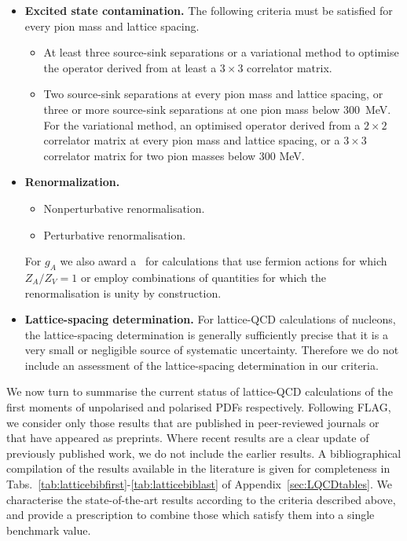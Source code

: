 \begin{itemize}
\item {\bfseries Excited state contamination.} 
The following criteria must be satisfied for every pion mass and lattice 
spacing.
%
\begin{itemize}
%
\item[\bstar] At least three source-sink separations or a variational method 
to optimise the operator derived from at least a $3\times 3$ correlator matrix.
% 
\item[\bcirc] Two source-sink separations at every pion mass and lattice 
spacing, or three or more source-sink separations at one pion mass below 
300~MeV. 
%
For the variational method, an optimised operator derived from a $2\times 2$ 
correlator matrix at every pion mass and lattice spacing, or a $3\times 3$ 
correlator matrix for two pion masses below 300 MeV.
%
\end{itemize}

\item {\bfseries Renormalization.} 
\begin{itemize}
%
\item[\bstar] Nonperturbative renormalisation.
%
\item[\bcirc] Perturbative renormalisation.
%
\end{itemize}
%
For $g_A$ we also award a \bstar~for calculations that use fermion actions 
for which $Z_A/Z_V=1$ or employ combinations of quantities for which the 
renormalisation is unity by construction.

\item {\bfseries Lattice-spacing determination.} 
For lattice-QCD calculations of nucleons, the lattice-spacing determination is 
generally sufficiently precise that it is a very small or negligible source
of systematic uncertainty. 
%
Therefore we do not include an assessment of the lattice-spacing
determination in our criteria.

\end{itemize}

We now turn to summarise the current status of lattice-QCD calculations of
the first moments of unpolarised and polarised PDFs respectively.
%
Following FLAG, we consider only those results that are published in 
peer-reviewed journals or that have appeared as preprints. 
%
Where recent results are a clear update of previously published work, we do 
not include the earlier results.
%
A bibliographical compilation of the results available in the literature 
is given for completeness in 
Tabs.~\ref{tab:latticebibfirst}-\ref{tab:latticebiblast} 
of Appendix~\ref{sec:LQCDtables}.
%
We characterise the state-of-the-art results according to the criteria 
described above, and provide a prescription to combine those which satisfy 
them into a single benchmark value.

